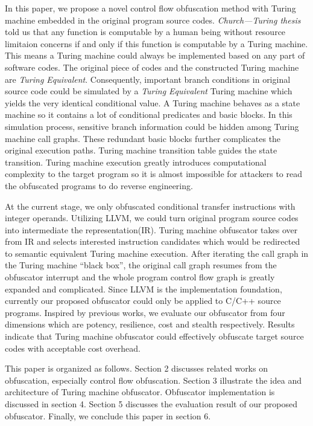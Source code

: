 \documentclass[lnicst]{svmultln}
\begin{document}
In this paper, we propose a novel control flow obfuscation method with Turing machine embedded in the original program source codes.
\textit{Church---Turing thesis} told us that any function is computable by a human being without resource limitaion concerns if and only if this function is computable by a Turing machine\cite{Church}. This means a Turing machine could always be implemented based on any part of software codes. The original piece of codes and the constructed Turing machine are \textit{Turing Equivalent}.
Consequently, important branch conditions in original source code could be simulated by a \textit{Turing Equivalent} Turing machine which yields the very identical conditional value. A Turing machine behaves as a state machine so it contains a lot of conditional predicates and basic blocks. In this simulation process, sensitive branch information could be  hidden among Turing machine call graphs.  These redundant basic blocks further complicates the original execution paths. Turing machine transition table guides the state transition. Turing machine execution greatly introduces computational complexity to the target program so it is almost impossible for attackers to read the obfuscated programs to do reverse engineering. 

At the current stage, we only obfuscated conditional transfer instructions with integer operands. Utilizing LLVM, we could turn original program source codes into intermediate the representation(IR). Turing machine obfuscator takes over from IR and selects interested instruction candidates which would be redirected to semantic equivalent Turing machine execution. After iterating the call graph in the Turing machine ``black box'', the original call graph resumes from the  obfuscator interrupt and the whole program control flow graph is greatly expanded and complicated. Since LLVM is the implementation foundation, currently our proposed obfuscator could only be applied to C/C++ source programs. Inspired by previous works\cite{Collberg}, we evaluate our obfuscator from four dimensions which are potency, resilience, cost and stealth respectively. Results indicate that Turing machine obfuscator could effectively obfuscate target source codes with acceptable cost overhead.

This paper is organized as follows. Section 2 discusses related works on obfuscation, especially control flow obfuscation. Section 3 illustrate the idea and architecture of Turing machine obfuscator. Obfuscator implementation is discussed in section 4. Section 5 discusses the evaluation result of our proposed obfuscator. Finally, we conclude this paper in section 6.
\end{document}
